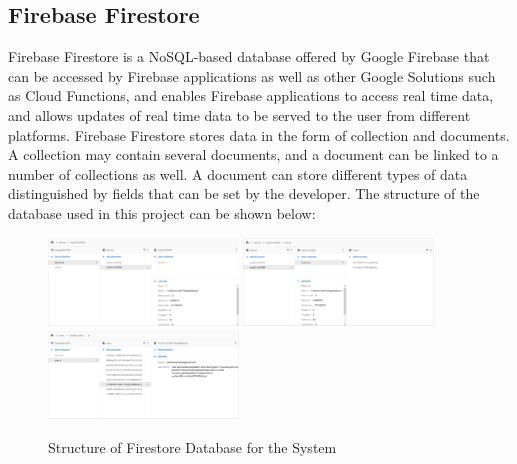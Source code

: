 \documentclass[conference]{IEEEtran}
\begin{document}
\subsection{Firebase Firestore}
Firebase Firestore is a NoSQL-based database offered by Google Firebase that can be accessed by Firebase applications as well as other Google Solutions such as Cloud Functions, and enables Firebase applications to access real time data, and allows updates of real time data 
to be served to the user from different platforms. Firebase Firestore stores data in the form of collection and documents. A collection may contain several documents, and a document can be linked to a number of collections as well. A document can store different types of data 
distinguished by fields that can be set by the developer. The structure of the database used in this project can be shown below: 

\begin{figure}[htbp]
    \centering
    \includegraphics[width=0.45\textwidth]{strukturdatabase1}
    \includegraphics[width=0.45\textwidth]{strukturdatabase2}
    \includegraphics[width=0.45\textwidth]{databaseuser}
    \caption{Structure of Firestore Database for the System}
    \label{fig1}
\end{figure}
\end{document}
